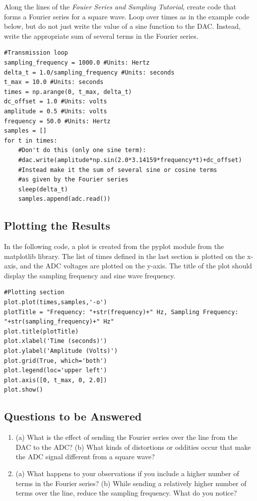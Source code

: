 \documentclass{article}
\begin{document}
Along the lines of the \textit{Fouier Series and Sampling Tutorial}, create code that forms a Fourier series for a square wave.  Loop over times as in the example code below, but do not just write the value of a sine function to the DAC.  Instead, write the appropriate sum of several terms in the Fourier series.

\begin{verbatim}
#Transmission loop
sampling_frequency = 1000.0 #Units: Hertz
delta_t = 1.0/sampling_frequency #Units: seconds
t_max = 10.0 #Units: seconds
times = np.arange(0, t_max, delta_t)
dc_offset = 1.0 #Units: volts
amplitude = 0.5 #Units: volts
frequency = 50.0 #Units: Hertz
samples = []
for t in times:
	#Don't do this (only one sine term):
    #dac.write(amplitude*np.sin(2.0*3.14159*frequency*t)+dc_offset)
    #Instead make it the sum of several sine or cosine terms
    #as given by the Fourier series
    sleep(delta_t)
    samples.append(adc.read())
\end{verbatim}

\subsection{Plotting the Results}

In the following code, a plot is created from the pyplot module from the matplotlib library.  The list of times defined in the last section is plotted on the x-axis, and the ADC voltages are plotted on the y-axis.  The title of the plot should display the sampling frequency and sine wave frequency.

\begin{verbatim}
#Plotting section
plot.plot(times,samples,'-o')
plotTitle = "Frequency: "+str(frequency)+" Hz, Sampling Frequency: "+str(sampling_frequency)+" Hz"
plot.title(plotTitle)
plot.xlabel('Time (seconds)')
plot.ylabel('Amplitude (Volts)')
plot.grid(True, which='both') 
plot.legend(loc='upper left')
plot.axis([0, t_max, 0, 2.0])
plot.show()
\end{verbatim}

\subsection{Questions to be Answered}

\begin{enumerate}
\item (a) What is the effect of sending the Fourier series over the line from the DAC to the ADC? (b) What kinds of distortions or oddities occur that make the ADC signal different from a square wave? \\ \vspace{2.5cm}
\item (a) What happens to your observations if you include a higher number of terms in the Fourier series? (b) While sending a relatively higher number of terms over the line, reduce the sampling frequency.  What do you notice? \vspace{2.5cm}
\end{enumerate}
\end{document}
